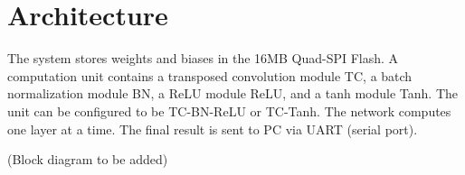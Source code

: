 \section{Architecture}

The system stores weights and biases in the 16MB Quad-SPI Flash. A computation unit contains a
transposed convolution module TC, a batch normalization module BN, a ReLU module ReLU, and a tanh module
Tanh. The unit can be configured to be TC-BN-ReLU or TC-Tanh. The network computes one layer at a time.
The final result is sent to PC via UART (serial port).

(Block diagram to be added)

\clearpage %
